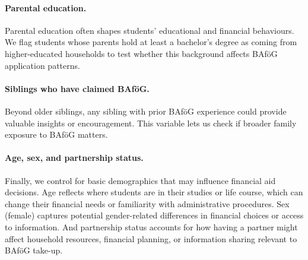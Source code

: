 \paragraph{Parental education.}  
Parental education often shapes students’ educational and financial behaviours.  
We flag students whose parents hold at least a bachelor’s degree as coming from higher-educated households to test whether this background affects BAföG application patterns.

\paragraph{Siblings who have claimed BAföG.}  
Beyond older siblings, any sibling with prior BAföG experience could provide valuable insights or encouragement.  
This variable lets us check if broader family exposure to BAföG matters.

\paragraph{Age, sex, and partnership status.}  
Finally, we control for basic demographics that may influence financial aid decisions.  
Age reflects where students are in their studies or life course, which can change their financial needs or familiarity with administrative procedures.  
Sex (female) captures potential gender-related differences in financial choices or access to information.  
And partnership status accounts for how having a partner might affect household resources, financial planning, or information sharing relevant to BAföG take-up.




